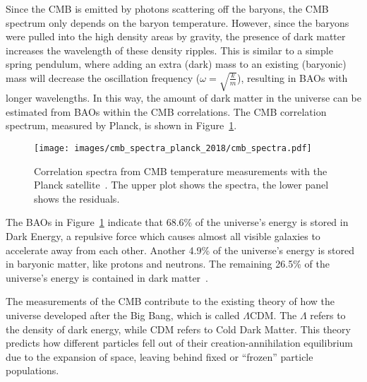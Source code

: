 Since the CMB is emitted by photons scattering off the baryons, the CMB spectrum only depends on the baryon temperature.
However, since the baryons were pulled into the high density areas by gravity, the presence of dark matter increases the wavelength of these density ripples.
This is similar to a simple spring pendulum, where adding an extra (dark) mass to an existing (baryonic) mass will decrease the oscillation frequency ($\omega = \sqrt{\frac{k}{m}}$), resulting in BAOs with longer wavelengths.
In this way, the amount of dark matter in the universe can be estimated from BAOs within the CMB correlations.
The CMB correlation spectrum, measured by Planck, is shown in Figure~\ref{fig:cmb_correlation_spectra}.

\begin{figure}[t]
  \centering
  \texttt{[image: images/cmb\_spectra\_planck\_2018/cmb\_spectra.pdf]}
  \caption[Cosmic Micrwave Background Correlation Spectrum]{
    Correlation spectra from CMB temperature measurements with the Planck satellite~\cite{planck_dm_limit}.
    The upper plot shows the spectra, the lower panel shows the residuals.
  }
  \label{fig:cmb_correlation_spectra}
\end{figure}

The BAOs in Figure~\ref{fig:cmb_correlation_spectra} indicate that 68.6\% of the universe's energy is stored in Dark Energy, a repulsive force which causes almost all visible galaxies to accelerate away from each other.
Another 4.9\% of the universe's energy is stored in baryonic matter, like protons and neutrons.
The remaining 26.5\% of the universe's energy is contained in dark matter~\cite{planck2015}.

The measurements of the CMB contribute to the existing theory of how the universe developed after the Big Bang, which is called $\Lambda$CDM.
The $\Lambda$ refers to the density of dark energy, while CDM refers to Cold Dark Matter.
This theory predicts how different particles fell out of their creation-annihilation equilibrium due to the expansion of space, leaving behind fixed or ``frozen'' particle populations.

%   


